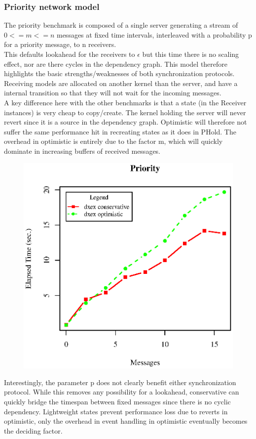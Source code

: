 \subsubsection{Priority network model}
The priority benchmark is composed of a single server generating a stream of $0<=m<=n$ messages at fixed time intervals, interleaved with a probability p for a priority message, to n receivers. \\ This defaults lookahead for the receivers to $\epsilon$ but this time there is no scaling effect, nor are there cycles in the dependency graph. This model therefore highlights the basic strengths/weaknesses of both synchronization protocols. Receiving models are allocated on another kernel than the server, and have a internal transition so that they will not wait for the incoming messages. 
 \\
A key difference here with the other benchmarks is that a state (in the Receiver instances) is very cheap to copy/create. The kernel holding the server will never revert since it is a source in the dependency graph. Optimistic will therefore not suffer the same performance hit in recreating states as it does in PHold. The overhead in optimistic is entirely due to the factor m, which will quickly dominate in increasing buffers of received messages.
\begin{figure}[ltbh]
	\includegraphics[width=.5\textwidth]{fig/fig5.eps}
	\label{fig5.eps}
\end{figure}
Interestingly, the parameter p does not clearly benefit either synchronization protocol. While this removes any possibility for a lookahead, conservative can quickly bridge the timespan between fixed messages since there is no cyclic dependency. Lightweight states prevent performance loss due to reverts in optimistic, only the overhead in event handling in optimistic eventually becomes the deciding factor.

